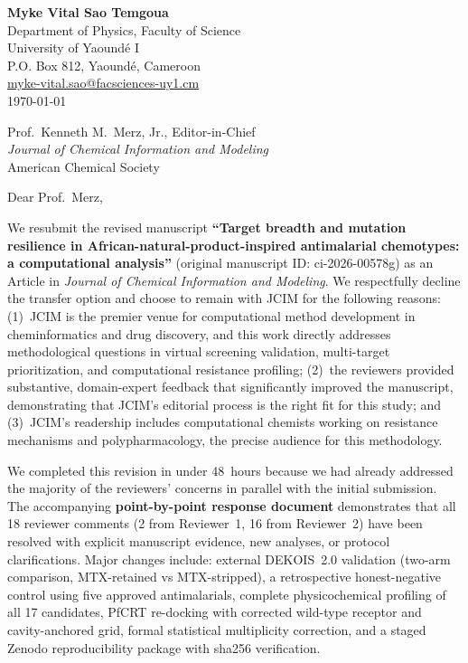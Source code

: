 \documentclass[9pt,letterpaper]{article}
\begin{document}
\fontsize{9}{10.5}\selectfont

\begin{flushleft}
\textbf{Myke Vital Sao Temgoua} \\
Department of Physics, Faculty of Science \\
University of Yaound\'{e} I \\
P.O. Box 812, Yaound\'{e}, Cameroon \\
\href{mailto:myke-vital.sao@facsciences-uy1.cm}{myke-vital.sao@facsciences-uy1.cm} \\[0.8em]
\today
\end{flushleft}

\begin{flushleft}
Prof.\ Kenneth M.\ Merz, Jr., Editor-in-Chief \\
\textit{Journal of Chemical Information and Modeling} \\
American Chemical Society
\end{flushleft}

\vspace{0.2em}

\noindent Dear Prof.\ Merz,

We resubmit the revised manuscript \textbf{``Target breadth and mutation resilience in African-natural-product-inspired antimalarial chemotypes: a computational analysis''} (original manuscript ID: ci-2026-00578g) as an Article in \textit{Journal of Chemical Information and Modeling}. We respectfully decline the transfer option and choose to remain with JCIM for the following reasons: (1)~JCIM is the premier venue for computational method development in cheminformatics and drug discovery, and this work directly addresses methodological questions in virtual screening validation, multi-target prioritization, and computational resistance profiling; (2)~the reviewers provided substantive, domain-expert feedback that significantly improved the manuscript, demonstrating that JCIM's editorial process is the right fit for this study; and (3)~JCIM's readership includes computational chemists working on resistance mechanisms and polypharmacology, the precise audience for this methodology.

We completed this revision in under 48~hours because we had already addressed the majority of the reviewers' concerns in parallel with the initial submission. The accompanying \textbf{point-by-point response document} demonstrates that all 18 reviewer comments (2 from Reviewer~1, 16 from Reviewer~2) have been resolved with explicit manuscript evidence, new analyses, or protocol clarifications. Major changes include: external DEKOIS~2.0 validation (two-arm comparison, MTX-retained vs MTX-stripped), a retrospective honest-negative control using five approved antimalarials, complete physicochemical profiling of all 17 candidates, PfCRT re-docking with corrected wild-type receptor and cavity-anchored grid, formal statistical multiplicity correction, and a staged Zenodo reproducibility package with sha256 verification.
\end{document}
